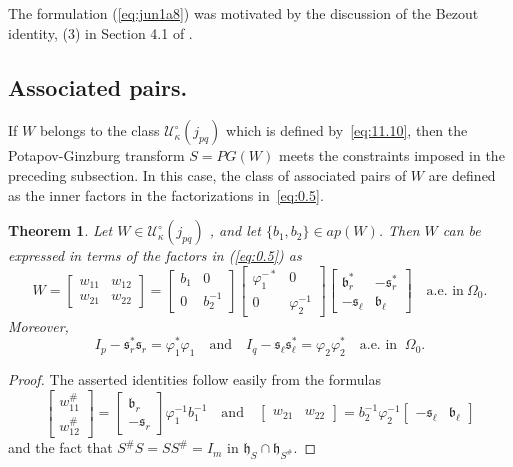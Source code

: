 \documentclass[12pt,twoside,a4paper]{amsart}
\newtheorem{thm}{Theorem}[section]
\theoremstyle{definition}
\numberwithin{equation}{section}
\begin{document}
The formulation (\ref{eq:jun1a8}) was motivated by the discussion of the
Bezout identity, (3) in Section 4.1 of \cite{fran}.

\subsection{Associated pairs.}
If $W$ belongs to the class ${{\mathcal U}}_\kappa^\circ(j_{pq})$ which is defined
by~\eqref{eq:11.10}, then the Potapov-Ginzburg transform $S=PG(W)$ meets the
constraints  imposed in the preceding subsection. In this case, the class of
associated pairs of $W$ are defined as the inner factors in the factorizations
in~\eqref{eq:0.5}.
\begin{thm}\label{thm:11.5}
Let $W\in {{\mathcal U}}_\kappa^\circ(j_{pq})$
, and let $\{b_1,
b_2\}\in ap(W)$. Then $W$ can be expressed in terms of the factors in
(\ref{eq:0.5}) as
\begin{equation}
\label{eq:may30a8}
W=\begin{bmatrix}w_{11}& w_{12}\\w_{21}& w_{22}\end{bmatrix}=
\begin{bmatrix}b_1&0\\0&b_2^{-1}\end{bmatrix}
\begin{bmatrix}\varphi_1^{-*}&0\\0&\varphi_2^{-1}\end{bmatrix}
\begin{bmatrix}{{\mathfrak b}}_r^* &-{{\mathfrak s}}_r^*\\-{{\mathfrak s}}_\ell&{{\mathfrak b}}_\ell\end{bmatrix}\quad
\text{a.e. in}\ \Omega_0.
\end{equation}
Moreover,
\begin{equation}\label{eq:sr}
    I_p-{{\mathfrak s}}_r^*{{\mathfrak s}}_r=\varphi_1^*\varphi_1 \quad \text{and}\quad
    I_q-{{\mathfrak s}}_\ell{{\mathfrak s}}_\ell^*=\varphi_2\varphi_2^*\quad \text{a.e. in }\ \Omega_0.
\end{equation}
\end{thm}

\begin{proof}
The asserted identities follow easily from the formulas
\begin{equation}\label{eq:w11star}
    \begin{bmatrix}
w_{11}^\#\\w_{12}^\#\end{bmatrix}=\begin{bmatrix}{{\mathfrak b}}_r\\
-{{\mathfrak s}}_r\end{bmatrix}\varphi_1^{-1}b_1^{-1}
\quad\text{and}\quad
\begin{bmatrix}w_{21}&w_{22}\end{bmatrix}
=b_2^{-1}\varphi_2^{-1}\begin{bmatrix}-{{\mathfrak s}}_\ell &
{{\mathfrak b}}_\ell\end{bmatrix}
\end{equation}
and the fact that $S^\#S=SS^\#=I_m$ in ${{\mathfrak h}}_S\cap{{\mathfrak h}}_{S^{\#}}$.
\end{proof}
\end{document}
